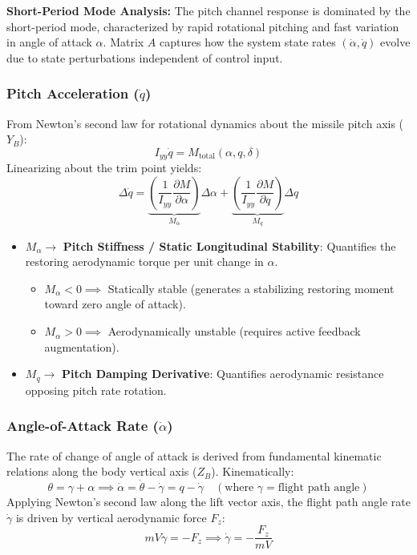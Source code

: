 \documentclass[11pt, a4paper]{article}
\begin{document}
\textbf{Short-Period Mode Analysis:} The pitch channel response is dominated by the short-period mode, characterized by rapid rotational pitching and fast variation in angle of attack $\alpha$. Matrix $A$ captures how the system state rates $(\dot{\alpha}, \dot{q})$ evolve due to state perturbations independent of control input.

\subsubsection{Pitch Acceleration ($\dot{q}$)}
From Newton's second law for rotational dynamics about the missile pitch axis ($Y_B$):
\begin{equation}
I_{yy} \dot{q} = M_{\text{total}}(\alpha, q, \delta)
\end{equation}
Linearizing about the trim point yields:
\begin{equation}
\Delta \dot{q} = \underbrace{\left( \frac{1}{I_{yy}} \frac{\partial M}{\partial \alpha} \right)}_{M_\alpha} \Delta \alpha + \underbrace{\left( \frac{1}{I_{yy}} \frac{\partial M}{\partial q} \right)}_{M_q} \Delta q
\end{equation}

\begin{itemize}
    \item $M_\alpha \rightarrow$ \textbf{Pitch Stiffness / Static Longitudinal Stability}: Quantifies the restoring aerodynamic torque per unit change in $\alpha$.
    \begin{itemize}
        \item $M_\alpha < 0 \implies$ Statically stable (generates a stabilizing restoring moment toward zero angle of attack).
        \item $M_\alpha > 0 \implies$ Aerodynamically unstable (requires active feedback augmentation).
    \end{itemize}
    \item $M_q \rightarrow$ \textbf{Pitch Damping Derivative}: Quantifies aerodynamic resistance opposing pitch rate rotation.
\end{itemize}

\subsubsection{Angle-of-Attack Rate ($\dot{\alpha}$)}
The rate of change of angle of attack is derived from fundamental kinematic relations along the body vertical axis ($Z_B$). Kinematically:
\begin{equation}
\theta = \gamma + \alpha \implies \dot{\alpha} = \dot{\theta} - \dot{\gamma} = q - \dot{\gamma} \quad (\text{where } \gamma = \text{flight path angle})
\end{equation}
Applying Newton's second law along the lift vector axis, the flight path angle rate $\dot{\gamma}$ is driven by vertical aerodynamic force $F_z$:
\begin{equation}
m V \dot{\gamma} = -F_z \implies \dot{\gamma} = -\frac{F_z}{m V}
\end{equation}
\end{document}

